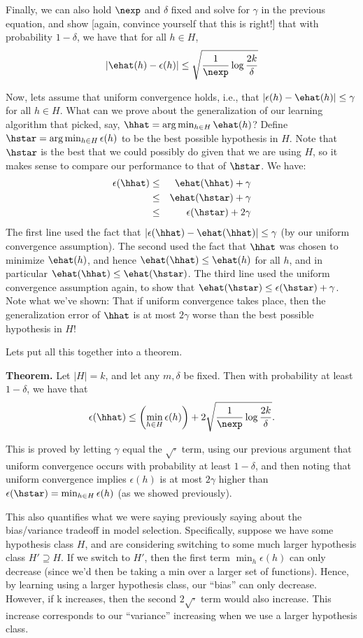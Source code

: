Finally, we can also hold $\nexp$ and $\delta$ fixed and solve for $\gamma$ 
in the previous equation, 
and show [again, convince yourself that this is right!] that with probability $1-\delta$, we 
have that for all $h \in H$, 
\[
|\ehat(h) - \epsilon(h)| \leq \sqrt{\frac{1}{\nexp}\log\frac{2k}{\delta}}
\]

Now, lets assume that uniform convergence holds, i.e., that 
$|\epsilon(h) - \ehat(h)| \leq \gamma$ for all $h \in H$.  What can we prove about
the generalization of our learning algorithm that picked, say, $\hhat = \arg \min_{h \in H}\ehat(h)$?
Define $\hstar = \arg \min_{h \in H} \epsilon(h)$ to be the best possible hypothesis in $H$.  
Note that $\hstar$ is the best that we could possibly do given that we are using $H$, so it
makes sense to compare our performance to that of $\hstar$. We have:
\begin{eqnarray*}
\epsilon(\hhat) &\leq& \ehat(\hhat) + \gamma  \\
&\leq& \ehat(\hstar) + \gamma  \\
&\leq& \epsilon(\hstar) + 2\gamma  
\end{eqnarray*}
The first line used the fact that $|\epsilon(\hhat) -\ehat(\hhat)| \leq \gamma$ (by our uniform
convergence assumption). The second used the fact that $\hhat$ was chosen to minimize $\ehat(h)$,
and hence $\ehat(\hhat) \leq \ehat(h)$ for all $h$, and in particular
$\ehat(\hhat) \leq \ehat(\hstar)$.  The third line used the uniform convergence assumption again,
to show that $\ehat(\hstar) \leq \epsilon(\hstar) + \gamma$.  Note 
what we've shown: That if uniform convergence 
takes place, then the generalization error of $\hhat$ is at 
most $2\gamma$ worse than the best possible hypothesis in $H$!

Lets put all this together into a theorem.

\noindent
{\bf Theorem.}  Let $|H| = k$, and let any $m, \delta$ be fixed.  Then with probability
at least $1-\delta$, we have that 
\[
\epsilon(\hhat) \leq \left( \min_{h \in H} \epsilon(h) \right) + 2 \sqrt{\frac{1}{\nexp}\log\frac{2k}{\delta}}.
\]

This is proved by letting $\gamma$ equal the $\sqrt{\cdot}$ term, using our previous argument
that uniform convergence occurs with probability at least $1-\delta$, and 
then noting that uniform convergence implies $\epsilon(h)$ is at 
most $2\gamma$ higher than $\epsilon(\hstar) = \min_{h \in H} \epsilon(h)$ 
(as we showed previously).  

This also quantifies what we were saying previously saying about the bias/variance tradeoff in model
selection.  Specifically, suppose we have some hypothesis class $H$, and are considering switching to
some much larger hypothesis class $H' \supseteq H$.  If we switch to $H'$, then the first term 
$\min_h \epsilon(h)$ can only decrease (since we'd then be taking a min 
over a larger set of functions).  Hence,
by learning using a larger hypothesis class, our ``bias'' can only 
decrease.  However, if k increases, then the second $2\sqrt{\cdot}$ term 
would also increase.  This increase corresponds to our ``variance'' increasing
when we use a larger hypothesis class.

